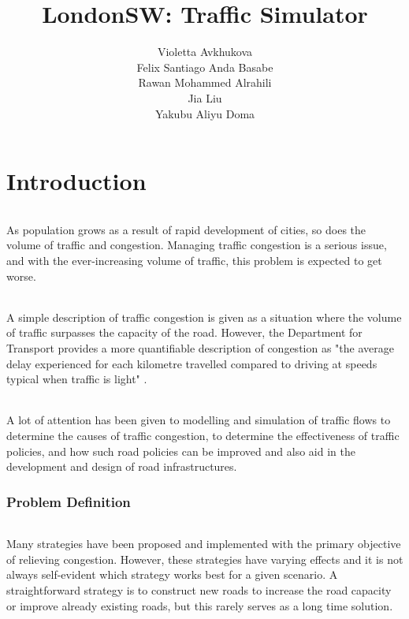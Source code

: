 \documentclass[a4paper,11pt,titlepage]{article}
\begin{document}
\title{LondonSW: Traffic Simulator}
\author{Violetta Avkhukova\\Felix Santiago Anda Basabe\\Rawan Mohammed Alrahili\\Jia Liu\\Yakubu Aliyu Doma}
\maketitle

\part{Introduction}
\paragraph{}
As population grows as a result of rapid development of cities, so does the volume of traffic and congestion. Managing traffic congestion is a serious issue, and with the ever-increasing volume of traffic, this problem is expected to get worse.
\paragraph{}
A simple description of traffic congestion is given as a situation where the volume of traffic surpasses the capacity of the road. However, the Department for Transport provides a more quantifiable description of congestion as "the average delay experienced for each kilometre travelled compared to driving at speeds typical when traffic is light" \cite{2}.
\paragraph{}
A lot of attention has been given to modelling and simulation of traffic flows to determine the causes of traffic congestion, to determine the effectiveness of traffic policies, and how such road policies can be improved and also aid in the development and design of road infrastructures.

\section{Problem Definition}
\paragraph{}
Many strategies have been proposed and implemented with the primary objective of relieving congestion. However, these strategies have varying effects and it is not always self-evident which strategy works best for a given scenario. A straightforward strategy is to construct new roads to increase the road capacity or improve already existing roads, but this rarely serves as a long time solution.
\end{document}
